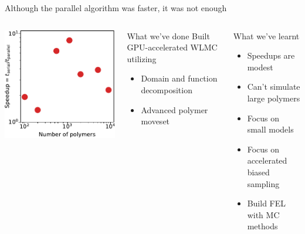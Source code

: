 \documentclass[aspectratio=169]{beamer}
\begin{document}
\begin{frame}[t]{Although the parallel algorithm was faster, it was not enough}

  \begin{columns}[T]

    \centering
    \vspace{.5\baselineskip}
    \includegraphics[]{../figures/ch3_gpu/fig-speedup_new/fig-speedup.pdf}


    \centering
    \begin{block}{What we've done}
      Built GPU-accelerated WLMC utilizing
      \begin{itemize} 
      \item Domain and function decomposition
      \item Advanced polymer moveset
    \end{itemize}
    \end{block}

    \begin{block}{What we've learnt}
      \begin{itemize} 
        \item Speedups are modest
        \item Can't simulate large polymers
        \item Focus on small models
        \item Focus on accelerated biased sampling
        \item Build FEL with MC methods
      \end{itemize}
    \end{block}

  \end{columns}
  
\end{frame}
\end{document}
